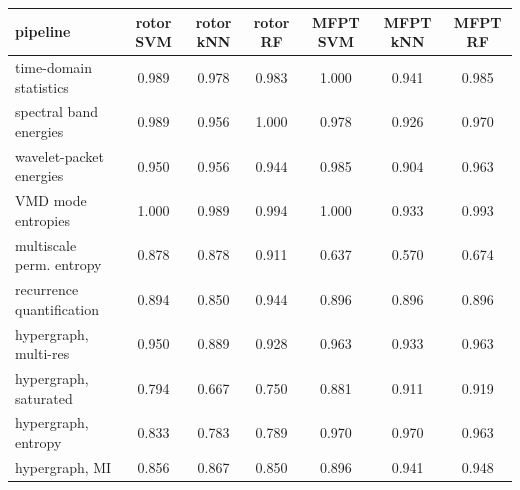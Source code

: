 \begin{tabular}{lcccccc}
\toprule
pipeline & rotor SVM & rotor kNN & rotor RF & MFPT SVM & MFPT kNN & MFPT RF \\
\midrule
time-domain statistics & 0.989 & 0.978 & 0.983 & 1.000 & 0.941 & 0.985 \\
spectral band energies & 0.989 & 0.956 & 1.000 & 0.978 & 0.926 & 0.970 \\
wavelet-packet energies & 0.950 & 0.956 & 0.944 & 0.985 & 0.904 & 0.963 \\
VMD mode entropies & 1.000 & 0.989 & 0.994 & 1.000 & 0.933 & 0.993 \\
multiscale perm. entropy & 0.878 & 0.878 & 0.911 & 0.637 & 0.570 & 0.674 \\
recurrence quantification & 0.894 & 0.850 & 0.944 & 0.896 & 0.896 & 0.896 \\
\midrule
hypergraph, multi-res & 0.950 & 0.889 & 0.928 & 0.963 & 0.933 & 0.963 \\
hypergraph, saturated & 0.794 & 0.667 & 0.750 & 0.881 & 0.911 & 0.919 \\
hypergraph, entropy & 0.833 & 0.783 & 0.789 & 0.970 & 0.970 & 0.963 \\
hypergraph, MI & 0.856 & 0.867 & 0.850 & 0.896 & 0.941 & 0.948 \\
\bottomrule
\end{tabular}
